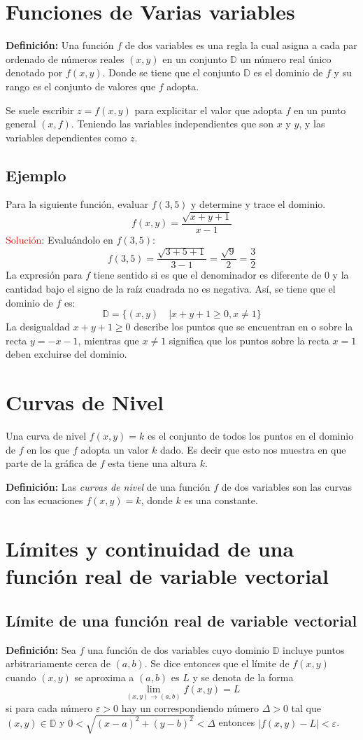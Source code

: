 \documentclass[../main]{subfiles}
\begin{document}
\chapter{Funciones de Varias variables}
\textbf{Definición:} Una función $f$ de dos variables es una regla la cual asigna a cada par ordenado de números reales $(x,y)$ en un conjunto $\mathbb{D}$ un número real único denotado por $f(x,y)$. Donde se tiene que el conjunto $\mathbb{D}$ es el dominio de $f$ y su rango es el conjunto de valores que $f$ adopta.

Se suele escribir $z=f(x,y)$ para explicitar el valor que adopta $f$ en un punto general $(x,f)$. Teniendo las variables independientes que son $x$ y $y$, y las variables dependientes como $z$.
\section*{Ejemplo}
Para la siguiente función, evaluar $f(3,5)$ y determine y trace el dominio.
$$
f(x,y)=\dfrac{\sqrt{x+y+1}}{x-1}
$$
\textcolor{red}{Solución}: Evaluándolo en $f(3,5)$:
$$
f(3,5)=\dfrac{\sqrt{3+5+1}}{3-1}=\dfrac{\sqrt{9}}{2}=\dfrac{3}{2}
$$
La expresión para $f$ tiene sentido si es que el denominador es diferente de $0$ y la cantidad bajo el signo de la raíz cuadrada no es negativa. Así, se tiene que el dominio de $f$ es:
$$
\mathbb{D}=\{(x,y) \quad | x+y+1\geq 0, x \neq 1 \}
$$
La desigualdad $x+y+1\geq 0$ describe los puntos que se encuentran en o sobre la recta $y=-x-1$, mientras que $x\neq 1$ significa que los puntos sobre la recta $x=1$ deben excluirse del dominio.
\chapter{Curvas de Nivel}
Una curva de nivel $f(x,y)=k$ es el conjunto de todos los puntos en el dominio de $f$ en los que $f$ adopta un valor $k$ dado. Es decir que esto nos muestra en que parte de la gráfica de $f$ esta tiene una altura $k$.

\textbf{Definición:} Las \textit{curvas de nivel} de una función $f$ de dos variables son las curvas con las ecuaciones $f(x,y)=k$, donde $k$ es una constante.
\chapter{Límites y continuidad de una función real de variable vectorial}
\section{Límite de una función real de variable vectorial}
\textbf{Definición:} Sea $f$ una función de dos variables cuyo dominio $\mathbb{D}$ incluye puntos arbitrariamente cerca de $(a,b)$. Se dice entonces que el límite de $f(x,y)$ cuando $(x,y)$ se aproxima a $(a,b)$ es $L$ y se denota de la forma
\begin{equation}
   \lim_{(x,y)\rightarrow (a,b)} f(x,y)=L 
\end{equation}
si para cada número $\varepsilon > 0$ hay un correspondiendo número $\varDelta >0$ tal que $(x,y) \in \mathbb{D}$ y $0 < \sqrt{(x-a)^2+(y-b)^2} < \varDelta$ entonces $|f(x,y)-L|< \varepsilon$.
\end{document}
